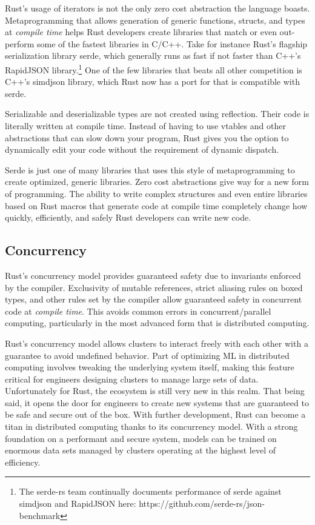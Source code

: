 \begin{multicols}{2}
Rust's usage of iterators is not the only zero cost abstraction the language boasts. Metaprogramming that allows
generation of generic functions, structs, and types at \textit{compile time} helps Rust developers create libraries
that match or even out-perform some of the fastest libraries in C/C++. Take for instance Rust's flagship serialization
library serde, which generally runs as fast if not faster than C++'s RapidJSON library.\footnote{The serde-rs team
continually documents performance of serde against simdjson and RapidJSON here: https://github.com/serde-rs/json-benchmark}
One of the few libraries that beats all other competition is C++'s simdjson library, which Rust now has a port for that
is compatible with serde.

Serializable and deserializable types are not created using reflection. Their code is literally written at compile time.
Instead of having to use vtables and other abstractions that can slow down your program, Rust gives you the option to
dynamically edit your code without the requirement of dynamic dispatch.

Serde is just one of many libraries that uses this style of metaprogramming to create optimized, generic libraries.
Zero cost abstractions give way for a new form of programming. The ability to write complex structures and even entire
libraries based on Rust macros that generate code at compile time completely change how quickly, efficiently, and safely
Rust developers can write new code.

\subsection{Concurrency}
Rust's concurrency model provides guaranteed safety due to invariants enforced by the compiler. Exclusivity of mutable
references, strict aliasing rules on boxed types, and other rules set by the compiler allow guaranteed safety in
concurrent code at \textit{compile time}. This avoids common errors in concurrent/parallel computing, particularly in
the most advanced form that is distributed computing.

Rust's concurrency model allows clusters to interact freely with each other with a guarantee to avoid undefined
behavior. Part of optimizing ML in distributed computing involves tweaking the underlying system itself, making this
feature critical for engineers designing clusters to manage large sets of data. Unfortunately for Rust, the ecosystem
is still very new in this realm. That being said, it opens the door for engineers to create new systems that are
guaranteed to be safe and secure out of the box. With further development, Rust can become a titan in distributed
computing thanks to its concurrency model. With a strong foundation on a performant and secure system, models can be
trained on enormous data sets managed by clusters operating at the highest level of efficiency.


\end{multicols}
